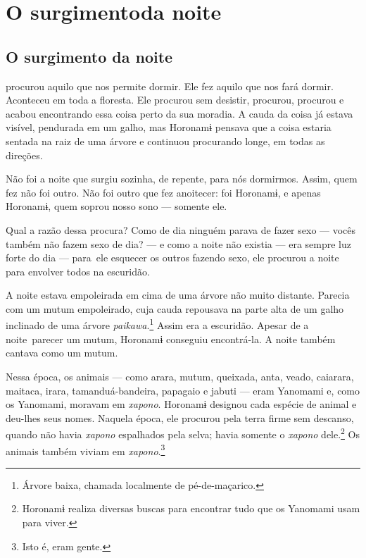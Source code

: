 
\part[O surgimento da noite]{O surgimento\break da noite}

\chapter{O surgimento da noite}

 procurou aquilo que nos permite dormir. Ele fez aquilo que nos
fará dormir. Aconteceu em toda a floresta. Ele procurou sem desistir,
procurou, procurou e acabou encontrando essa coisa perto da sua moradia.
A cauda da coisa já estava visível, pendurada em um galho, mas Horonamɨ
pensava que a coisa estaria sentada na raiz de uma árvore e continuou
procurando longe, em todas as direções. 

Não foi a noite que surgiu sozinha, de repente, para nós dormirmos.
 Assim, quem fez não foi outro. Não foi outro que fez anoitecer: foi
 Horonamɨ, e apenas Horonamɨ, quem soprou nosso sono --- somente ele. 

Qual a razão dessa procura? Como de dia ninguém parava de fazer sexo ---
 vocês também não fazem sexo de dia? --- e como a noite não existia ---
 era sempre luz forte do dia --- para~ele esquecer os outros fazendo
 sexo, ele procurou a noite para envolver todos na escuridão.

A noite estava empoleirada em cima de uma árvore não muito distante.
Parecia com um mutum empoleirado, cuja cauda repousava na parte alta de
um galho inclinado de uma árvore \textit{paikawa}.\footnote{Árvore baixa, chamada localmente de pé-de-maçarico.}  Assim era a escuridão. Apesar de a noite~parecer um mutum, Horonamɨ conseguiu
encontrá-la. A noite também cantava como um mutum.

Nessa época, os animais --- como arara, mutum, queixada, anta, veado,
caiarara, maitaca, irara, tamanduá-bandeira, papagaio e jabuti --- eram
Yanomami e, como os Yanomami, moravam em \textit{xapono}. Horonamɨ designou cada
espécie de animal e deu-lhes seus nomes. Naquela época, ele procurou
pela terra firme sem descanso, quando não havia \textit{xapono} espalhados pela
selva; havia somente o \textit{xapono} dele.\footnote{Horonamɨ realiza diversas buscas 
para encontrar tudo que os Yanomami usam para viver.}  Os animais também
viviam em \textit{xapono}.\footnote{Isto é, eram gente.} 


